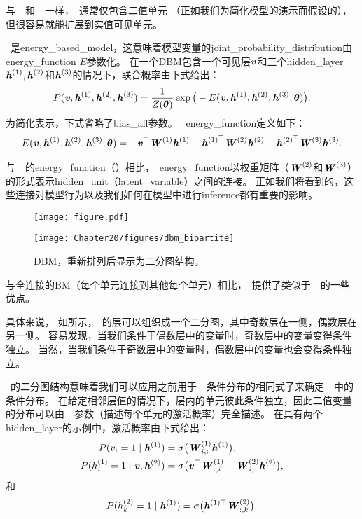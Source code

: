 与~~和~~一样，~通常仅包含二值单元 （正如我们为简化模型的演示而假设的），但很容易就能扩展到实值可见单元。

~是\gls{energy_based_model}，这意味着模型变量的\gls{joint_probability_distribution}由\gls{energy_function} $E$参数化。
在一个\gls{DBM}包含一个可见层$\boldsymbol{\mathit{v}}$和三个\gls{hidden_layer} $\boldsymbol{\mathit{h}}^{(1)},\boldsymbol{\mathit{h}}^{(2)}$和$\boldsymbol{\mathit{h}}^{(3)}$的情况下，联合概率由下式给出：
\begin{align}
 P(\boldsymbol{\mathit{v}}, \boldsymbol{\mathit{h}}^{(1)},  \boldsymbol{\mathit{h}}^{(2)},  \boldsymbol{\mathit{h}}^{(3)}) = \frac{1}{Z(\boldsymbol{\theta})} 
 \exp \big( -E(\boldsymbol{\mathit{v}}, \boldsymbol{\mathit{h}}^{(1)},  \boldsymbol{\mathit{h}}^{(2)},  \boldsymbol{\mathit{h}}^{(3)}; \boldsymbol{\theta}) \big).
\end{align}
为简化表示，下式省略了\gls{bias_aff}参数。
~\gls{energy_function}定义如下：
\begin{align}
    E(\boldsymbol{\mathit{v}}, \boldsymbol{\mathit{h}}^{(1)}, \boldsymbol{\mathit{h}}^{(2)}, \boldsymbol{\mathit{h}}^{(3)}; \boldsymbol{\theta})  = -\boldsymbol{\mathit{v}}^\top \boldsymbol{\mathit{W}}^{(1)}\boldsymbol{\mathit{h}}^{(1)} 
 - \boldsymbol{\mathit{h}}^{(1)^\top}\boldsymbol{\mathit{W}}^{(2)}\boldsymbol{\mathit{h}}^{(2)}- \boldsymbol{\mathit{h}}^{(2)^\top}\boldsymbol{\mathit{W}}^{(3)}\boldsymbol{\mathit{h}}^{(3)}.
\end{align}

与~~的\gls{energy_function}（）相比，~\gls{energy_function}以权重矩阵（$\boldsymbol{\mathit{W}}^{(2)}$和$\boldsymbol{\mathit{W}}^{(3)}$）的形式表示\gls{hidden_unit}（\gls{latent_variable}）之间的连接。
正如我们将看到的，这些连接对模型行为以及我们如何在模型中进行\gls{inference}都有重要的影响。


\begin{figure}[!htb]
\ifOpenSource
\centerline{\texttt{[image: figure.pdf]}}
\else
\centerline{\texttt{[image: Chapter20/figures/dbm\_bipartite]}}
\fi
\caption{\gls{DBM}，重新排列后显示为二分图结构。}
\label{fig:chap20_dbm_bipartite}
\end{figure}

与全连接的\gls{BM}（每个单元连接到其他每个单元）相比，~提供了类似于~~的一些优点。

具体来说， 如所示，~的层可以组织成一个二分图，其中奇数层在一侧，偶数层在另一侧。
容易发现，当我们条件于偶数层中的变量时，奇数层中的变量变得条件独立。   
当然，当我们条件于奇数层中的变量时，偶数层中的变量也会变得条件独立。

~的二分图结构意味着我们可以应用之前用于~~条件分布的相同式子来确定~~中的条件分布。
在给定相邻层值的情况下，层内的单元彼此条件独立，因此二值变量的分布可以由~~参数（描述每个单元的激活概率）完全描述。
在具有两个\gls{hidden_layer}的示例中，激活概率由下式给出：
\begin{align}
 P(v_i=1  \mid  \boldsymbol{\mathit{h}}^{(1)}) &= \sigma \big( \boldsymbol{\mathit{W}}_{i,:}^{(1)}\boldsymbol{\mathit{h}}^{(1)} \big), \\
 P(h_i^{(1)}=1  \mid  \boldsymbol{\mathit{v}}, \boldsymbol{\mathit{h}}^{(2)}) &= \sigma \big( \boldsymbol{\mathit{v}}^\top  \boldsymbol{\mathit{W}}_{:,i}^{(1)}
 + \boldsymbol{\mathit{W}}_{i,:}^{(2)}\boldsymbol{\mathit{h}}^{(2)} \big) ,
\end{align}
和
\begin{align}
P(h_k^{(2)} =1  \mid  \boldsymbol{\mathit{h}}^{(1)}) = \sigma \big(\boldsymbol{\mathit{h}}^{(1)\top} \boldsymbol{\mathit{W}}_{:,k}^{(2)} \big).
\end{align}

